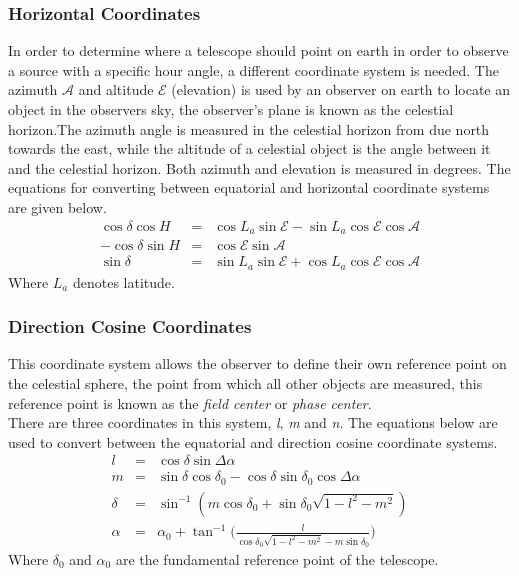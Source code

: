 \subsubsection{Horizontal Coordinates}
In order to determine where a telescope should point on earth in order to observe a source with a specific hour angle, a different coordinate system is needed. The azimuth $\mathcal{A}$ and altitude $\mathcal{E}$ (elevation) is used by an observer on earth to locate an object in the observers sky, the observer's plane is known as the celestial horizon.The azimuth angle is measured in the celestial horizon from due north towards the east, while the altitude of a celestial object is the angle between it and the celestial horizon. Both azimuth and elevation is measured in degrees. The equations for converting between equatorial and horizontal coordinate systems are given below. \begin{eqnarray}
\cos\delta\cos H &=& \cos L_a\sin \mathcal{E} - \sin L_a\cos \mathcal{E}\cos \mathcal{A}\\
-\cos\delta\sin H&=& \cos \mathcal{E}\sin \mathcal{A}\\
\sin\delta &=& \sin L_a\sin \mathcal{E}+\cos L_a \cos \mathcal{E} \cos \mathcal{A} 
\end{eqnarray}
Where $L_a$ denotes latitude.
\subsubsection{Direction Cosine Coordinates}
This coordinate system allows the observer to define their own reference point on the celestial sphere, the point from which all other objects are measured, this reference point is known as the \textit{field center} or \textit{phase center}. \\
There are three coordinates in this system, \textit{l}, \textit{m} and \textit{n}. The equations below are used to convert between the equatorial and direction cosine coordinate systems. 
\begin{eqnarray}
l &=&  \cos \delta  \sin \Delta \alpha \nonumber\\
m &=& \sin \delta \cos \delta_0 - \cos \delta \sin \delta_0 \cos\Delta \alpha \nonumber\\
\delta &=& \sin^{-1}(m\cos \delta_0 + \sin \delta_0\sqrt{1-l^2-m^2})\nonumber\\
\alpha &=& \alpha_0 + \tan^{-1}\bigg(\frac{l}{\cos\delta_0\sqrt{1-l^2-m^2}-m\sin\delta_0}\bigg)\nonumber
\end{eqnarray}
Where $\delta_0$ and $\alpha_0$ are the fundamental reference point of the telescope.
